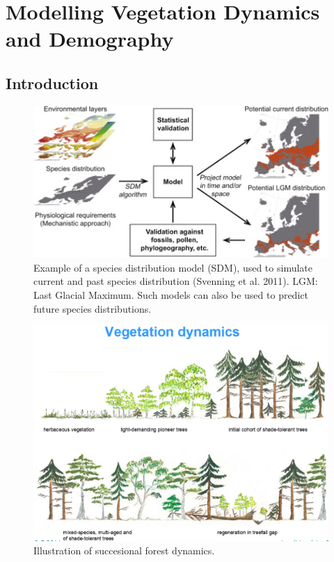 \documentclass[12pt,oneside]{book}
\begin{document}
\chapter{Modelling Vegetation Dynamics and
Demography}\label{modelling-vegetation-dynamics-and-demography}


\section{Introduction}\label{introduction-2}

\begin{figure}

{\centering \includegraphics[width=0.8\linewidth]{figures/chap6/f61_svenning_SDM} 

}

\caption{Example of a species distribution model (SDM), used to simulate current and past species distribution (Svenning et al. 2011). LGM: Last Glacial Maximum. Such models can also be used to predict future species distributions.}\label{fig:f61}
\end{figure}

\begin{figure}

{\centering \includegraphics[width=0.8\linewidth]{figures/chap6/f62_demography} 

}

\caption{Illustration of succesional forest dynamics.}\label{fig:f62}
\end{figure}
\end{document}
